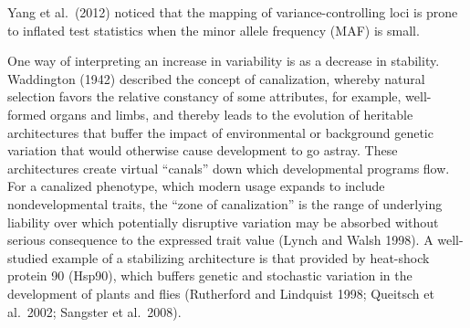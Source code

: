 \documentclass[
]{book}
\begin{document}
Yang et al.~(2012) noticed that the mapping of variance-controlling loci is prone to inflated test statistics when the minor allele frequency (MAF) is small.

One way of interpreting an increase in variability is as a decrease in stability. Waddington (1942) described the concept of canalization, whereby natural selection favors the relative constancy of some attributes, for example, well-formed organs and limbs, and thereby leads to the evolution of heritable architectures that buffer the impact of environmental or background genetic variation that would otherwise cause development to go astray. These architectures create virtual ``canals'' down which developmental programs flow. For a canalized phenotype, which modern usage expands to include nondevelopmental traits, the ``zone of canalization'' is the range of underlying liability over which potentially disruptive variation may be absorbed without serious consequence to the expressed trait value (Lynch and Walsh 1998). A well-studied example of a stabilizing architecture is that provided by heat-shock protein 90 (Hsp90), which buffers genetic and stochastic variation in the development of plants and flies (Rutherford and Lindquist 1998; Queitsch et al.~2002; Sangster et al.~2008).
\end{document}
